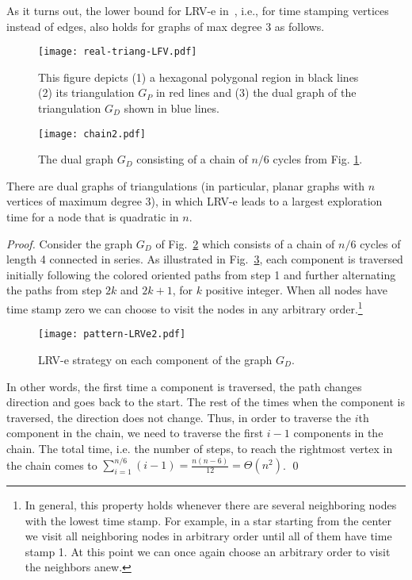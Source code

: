 As it turns out, the lower bound for LRV-e in~\cite{cik+-drwug-11}, i.e., for time stamping vertices instead of edges,
also holds for graphs of max degree 3 as follows.
\begin{figure}[h]\centering
 \texttt{[image: real-triang-LFV.pdf]}
\caption{This figure depicts (1) a hexagonal polygonal region in black lines (2) its triangulation $G_P$ in red lines
and (3) the dual graph of the triangulation $G_D$ shown in blue lines.} \label{triang}
 \end{figure}

\begin{figure}[h]\centering
\texttt{[image: chain2.pdf]}
\caption{The dual graph $G_D$ consisting of a chain of $n/6$ cycles from Fig. \ref{triang}.} \label{GD-LRVe}
 \end{figure}

\begin{theorem}
\label{th:lb.LRV-e}
There are dual graphs of triangulations (in particular, planar graphs with $n$ vertices of maximum degree 3),
in which LRV-e leads to a largest exploration time for a node
that is quadratic in $n$.
\end{theorem}

\begin{proof}
Consider the graph $G_D$ of Fig.~\ref{GD-LRVe} which consists of a chain of $n/6$ cycles of length 4 connected in series.
As illustrated in Fig.~\ref{pattern-LRVe}, each component is traversed
initially following the colored oriented paths from step 1 and further
alternating the paths from step $2k$ and $2k+1$, for $k$ positive integer.
When all nodes have time stamp zero we can choose to visit the nodes in any arbitrary
order.\footnote{In general, this property holds whenever there are several neighboring nodes
with the lowest time stamp. For example, in a star starting from the center we visit all neighboring
nodes in arbitrary order until all
of them have time stamp 1. At this point we can once again choose an arbitrary order to visit the
neighbors anew.}

 \begin{figure}\centering
 \texttt{[image: pattern-LRVe2.pdf]}
\caption{LRV-e strategy on each component of the graph $G_D$.} \label{pattern-LRVe}
 \end{figure}
In other words, the first time a component is traversed, the path
changes direction and goes back to the start. The rest of the times
when the component is traversed, the direction does not change.
Thus, in order to traverse the $i$th component in the chain, we need
to traverse the first $i-1$ components in the chain.
The total time, i.e. the number of steps, to reach the rightmost vertex in the chain comes to
$\sum_{i=1}^{n/6}(i-1)=\frac{n(n-6)}{12}=\Theta(n^2)$.
\qed
\end{proof}

